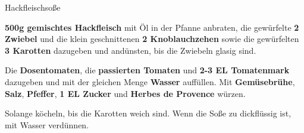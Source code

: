 \begin{recipe}[]{Hackfleischsoße} %

\step
\textbf{500g gemischtes Hackfleisch} mit Öl in der Pfanne anbraten, die gewürfelte \textbf{2 Zwiebel} und die klein geschnittenen \textbf{2 Knoblauchzehen} sowie die gewürfelten \textbf{3 Karotten} dazugeben und andünsten, bis die Zwiebeln glasig sind.

\step
Die \textbf{Dosentomaten}, die \textbf{passierten Tomaten} und \textbf{2-3 EL Tomatenmark} dazugeben und mit der gleichen Menge \textbf{Wasser} auffüllen. Mit \textbf{Gemüsebrühe}, \textbf{Salz}, \textbf{Pfeffer}, \textbf{1 EL Zucker} und \textbf{Herbes de Provence} würzen.

\step
Solange köcheln, bis die Karotten weich sind. Wenn die Soße zu dickflüssig ist, mit Wasser verdünnen.




\end{recipe}